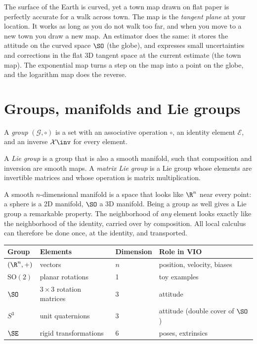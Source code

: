 \begin{keyidea}
The surface of the Earth is curved, yet a town map drawn on flat paper is perfectly accurate for a
walk across town. The map is the \emph{tangent plane} at your location. It works as long as you do
not walk too far, and when you move to a new town you draw a new map. An estimator does the same:
it stores the attitude on the curved space $\SO$ (the globe), and expresses small uncertainties and
corrections in the flat 3D tangent space at the current estimate (the town map). The exponential
map turns a step on the map into a point on the globe, and the logarithm map does the reverse.
\end{keyidea}

\section{Groups, manifolds and Lie groups}

\begin{definition}[Group]
A \emph{group} $(\mathcal{G}, \circ)$ is a set with an associative operation $\circ$, an identity
element $\mathcal{E}$, and an inverse $\mathcal{X}\inv$ for every element.
\end{definition}

\begin{definition}
A \emph{Lie group} is a group that is also a smooth manifold, such that composition and inversion are
smooth maps. A \emph{matrix Lie group} is a Lie group whose elements are invertible matrices and
whose operation is matrix multiplication.
\end{definition}

A smooth $n$-dimensional manifold is a space that looks like $\R^n$ near every point: a sphere is
a 2D manifold, $\SO$ a 3D manifold. Being a group as well gives a Lie group a remarkable property.
The neighborhood of \emph{any} element looks exactly like the neighborhood of the identity, carried
over by composition. All local calculus can therefore be done once, at the identity, and transported.

\begin{center}\small
\begin{tabular}{@{}l l l l@{}}
\toprule
Group & Elements & Dimension & Role in VIO \\
\midrule
$(\R^n, +)$ & vectors & $n$ & position, velocity, biases \\
$\mathrm{SO}(2)$ & planar rotations & 1 & toy examples \\
$\SO$ & $3\times3$ rotation matrices & 3 & attitude \\
$S^3$ & unit quaternions & 3 & attitude (double cover of $\SO$) \\
$\SE$ & rigid transformations & 6 & poses, extrinsics \\
\bottomrule
\end{tabular}
\end{center}

